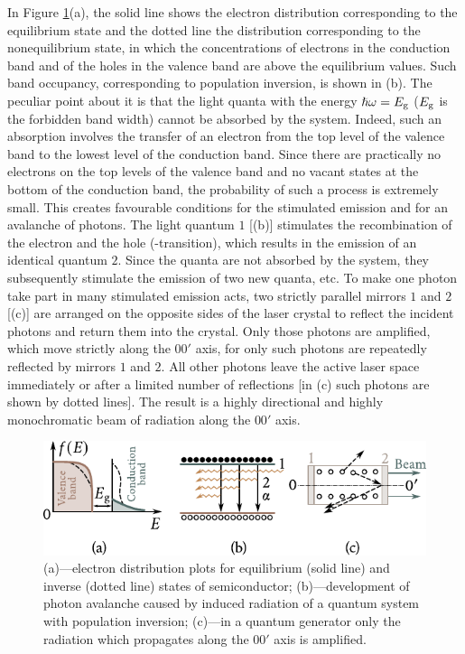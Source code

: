 In Figure \ref{fig:8_25}(a), the solid line shows the electron distribution corresponding to the equilibrium state and the dotted line the distribution corresponding to the nonequilibrium state, in which the concentrations of electrons in the conduction band and of the holes in the valence band are above the equilibrium values. Such band occupancy, corresponding to population inversion, is shown in (b). The peculiar point about it is that the light quanta with the energy $\hslash\omega=E_{\text{g}}$ ($E_{\text{g}}$ is the forbidden band width) cannot be absorbed by the system. Indeed, such an absorption involves the transfer of an electron from the top level of the valence band to the lowest level of the conduction band. Since there are practically no electrons on the top levels of the valence band and no vacant states at the bottom of the conduction band, the probability of such a process is extremely small. This creates favourable conditions for the stimulated emission and for an avalanche of photons. The light quantum $1$ [(b)] stimulates the recombination of the electron and the hole (\ce{\alpha}-transition), which results in the emission of an identical quantum $2$. Since the quanta are not absorbed by the system, they subsequently stimulate the emission of two new quanta, etc. To make one photon take part in many stimulated emission acts, two strictly parallel mirrors $1$ and $2$ [(c)] are arranged on the opposite sides of the laser crystal to reflect the incident photons and return them into the crystal. Only those photons are amplified, which move strictly along the $00'$ axis, for only such photons are repeatedly reflected by mirrors $1$ and $2$.
All other photons leave the active laser space immediately or after a limited number of reflections [in (c) such photons are shown by dotted lines]. The result is a highly directional and highly monochromatic beam of radiation along the $00'$ axis.

\begin{figure}[t]
	\begin{center}
		\includegraphics[scale=1.1]{figures/ch_08/fig_8_25.pdf}
		\caption[]{(a)---electron distribution plots for equilibrium (solid line) and inverse (dotted line) states of semiconductor; (b)---development of photon avalanche caused by induced radiation of a quantum system with population inversion; (c)---in a quantum generator only the radiation which propagates along the $00'$ axis is amplified.}
		\label{fig:8_25}
	\end{center}
	\vspace{-0.8cm}
\end{figure}

